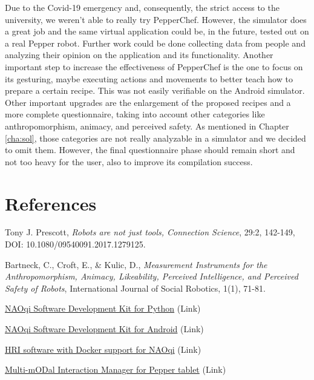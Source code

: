 \documentclass[11pt]{article}
\begin{document}
Due to the Covid-19 emergency and, consequently, the strict access to the university, we weren't able to really try PepperChef. However, the simulator does a great job and the same virtual application could be, in the future, tested out on a real Pepper robot. Further work could be done collecting data from people and analyzing their opinion on the application and its functionality.  Another important step to increase the effectiveness of PepperChef is the one to focus on its gesturing, maybe executing actions and movements to better teach how to prepare a certain recipe. This was not easily verifiable on the Android simulator. Other important upgrades are the enlargement of the proposed recipes and a more complete questionnaire, taking into account other categories like anthropomorphism, animacy, and perceived safety. As mentioned in Chapter \ref{cha:sol}, those categories are not really analyzable in a simulator and we decided to omit them. However, the final questionnaire phase should remain short and not too heavy for the user, also to improve its compilation success.

\newpage
\section{References}
\begin{thebibliography}{999}

	Tony J. Prescott, \emph{Robots are not just tools, Connection Science}, 29:2, 142-149, DOI: 10.1080/09540091.2017.1279125.

	Bartneck, C., Croft, E., \& Kulic, D., \emph{Measurement Instruments for the Anthropomorphism, Animacy, Likeability, Perceived Intelligence, and Perceived Safety of Robots}, International Journal of Social Robotics, 1(1), 71-81.

  \href{http://doc.aldebaran.com/2-5/dev/python/index.html}{NAOqi Software Development Kit for Python} (Link)  

  \href{https://qisdk.softbankrobotics.com/sdk/doc/pepper-sdk/index.html}{NAOqi Software Development Kit for Android} (Link)  

	\href{https://bitbucket.org/iocchi/hri_software/src/master/}{HRI software with Docker support for NAOqi} (Link) 

	\href{https://bitbucket.org/mtlazaro/modim/src/master/}{Multi-mODal Interaction Manager for Pepper tablet} (Link)  

\end{thebibliography}
\end{document}
